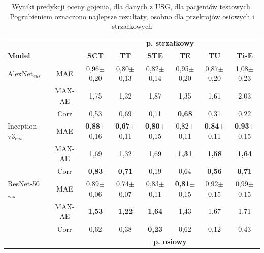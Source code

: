 \renewcommand{\arraystretch}{1.2}
\begin{table}[h]
	\scriptsize
	\setlength{\tabcolsep}{3pt}
	\centering
	\caption{Wyniki predykcji oceny gojenia, dla danych z USG, dla pacjentów testowych. Pogrubieniem oznaczono najlepsze rezultaty, osobno dla przekrojów osiowych i strzałkowych}
	\label{tab:usg_train_cross-validation}
	\begin{tabular}{lc||c|c|c|c|c|c}
		& & \multicolumn{6}{c}{\textbf{p. strzałkowy}} \\
		\textbf{Model} & & \textbf{SCT} & \textbf{TT} & \textbf{STE} & \textbf{TE} & \textbf{TU} & \textbf{TisE} \\ \hline \hline
		AlexNet$_{eus}$ & MAE & 0,96$\pm$0,20 & 0,80$\pm$0,13 & 0,82$\pm$0,14 & 0,95$\pm$0,20 & 0,87$\pm$0,20 & 1,08$\pm$0,23  \\
		& MAX-AE & 1,75 & 1,32 & 1,87 & 1,35 & 1,61 & 2,03 \\ 
		& Corr & 0,53 & 0,69 & 0,11 & \textbf{0,68} & 0,31 & 0,22 \\ \hline
		Inception-v3$_{eus}$ & MAE & \textbf{0,88}$\pm$0,16 & \textbf{0,67}$\pm$0,11 & \textbf{0,80}$\pm$0,15 & 0,82$\pm$0,11 & \textbf{0,84}$\pm$0,11 & \textbf{0,93}$\pm$0,15  \\
		& MAX-AE & 1,69 & 1,32 & 1,69 & \textbf{1,31} & \textbf{1,58} & \textbf{1,64} \\ 
		& Corr & \textbf{0,83} & \textbf{0,71} & 0,19 & 0,64 & \textbf{0,56} & \textbf{0,71} \\ \hline
		ResNet-50$_{eus}$ & MAE & 0,89$\pm$0,06 & 0,74$\pm$0,07 & 0,83$\pm$0,11 & \textbf{0,81}$\pm$0,15 & 0,92$\pm$0,15 & 0,99$\pm$0,15 \\
		& MAX-AE & \textbf{1,53} & \textbf{1,22} & \textbf{1,64} & 1,43 & 1,67 & 1,71 \\
		& Corr & 0,62 & 0,38 & \textbf{0,23} & 0,62 & 0,12 & 0,43 \\ \hline \hline
		& & \multicolumn{6}{c}{\textbf{p. osiowy}} \\
		

\end{tabular}
\end{table}
